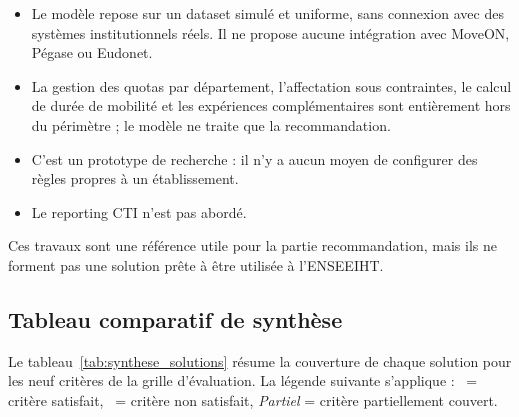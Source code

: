 \begin{itemize}
    \item Le modèle repose sur un dataset simulé et uniforme, sans connexion avec des systèmes institutionnels réels. Il ne propose aucune intégration avec MoveON, Pégase ou Eudonet.

    \item La gestion des quotas par département, l'affectation sous contraintes, le calcul de durée de mobilité et les expériences complémentaires sont entièrement hors du périmètre ; le modèle ne traite que la recommandation.

    \item C'est un prototype de recherche : il n'y a aucun moyen de configurer des règles propres à un établissement.

    \item Le reporting CTI n'est pas abordé.
\end{itemize}

Ces travaux sont une référence utile pour la partie recommandation, mais ils ne forment pas une solution prête à être utilisée à l'ENSEEIHT.

\subsection{Tableau comparatif de synthèse}

Le tableau~\ref{tab:synthese_solutions} résume la couverture de chaque solution pour les neuf critères de la grille d'évaluation. La légende suivante s'applique : \cmark\ = critère satisfait, \xmark\ = critère non satisfait, \textit{Partiel} = critère partiellement couvert.

